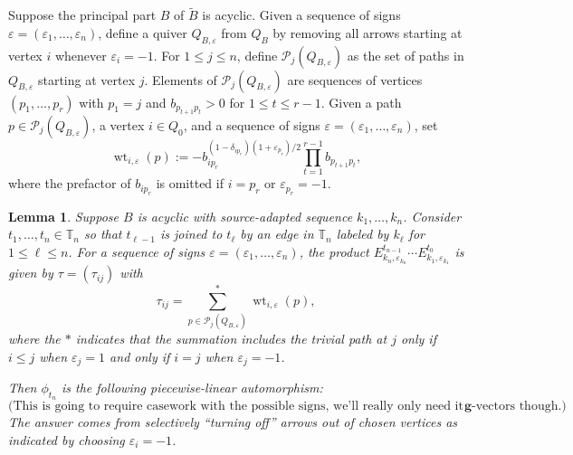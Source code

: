 \documentclass{amsart}
\newtheorem{lemma}[theorem]{Lemma}
\numberwithin{theorem}{section}
\newcommand{\bfg}{\boldsymbol{g}}
\newcommand{\cP}{\mathcal{P}}
\newcommand{\TT}{\mathbb{T}}
\newcommand{\wt}{{\operatorname{wt}}}
\begin{document}
  Suppose the principal part $B$ of $\tilde{B}$ is acyclic.
  Given a sequence of signs $\varepsilon=(\varepsilon_1,\ldots,\varepsilon_n)$, define a quiver $Q_{B,\varepsilon}$ from $Q_B$ by removing all arrows starting at vertex $i$ whenever $\varepsilon_i=-1$.
  For $1\le j\le n$, define $\cP_j(Q_{B,\varepsilon})$ as the set of paths in $Q_{B,\varepsilon}$ starting at vertex $j$.
  Elements of $\cP_j(Q_{B,\varepsilon})$ are sequences of vertices $(p_1,\ldots,p_r)$ with $p_1=j$ and $b_{p_{t+1}p_t}>0$ for $1\le t\le r-1$.
  Given a path $p\in\cP_j(Q_{B,\varepsilon})$, a vertex $i\in Q_0$, and a sequence of signs $\varepsilon=(\varepsilon_1,\ldots,\varepsilon_n)$, set
  \[\wt_{i,\varepsilon}(p):=-b_{ip_r}^{(1-\delta_{ip_r})(1+\varepsilon_{p_r})/2}\prod_{t=1}^{r-1} b_{p_{t+1}p_t},\]
  where the prefactor of $b_{ip_r}$ is omitted if $i=p_r$ or $\varepsilon_{p_r}=-1$.
  \begin{lemma}
    Suppose $B$ is acyclic with source-adapted sequence $k_1,\ldots,k_n$.
    Consider $t_1,\ldots,t_n\in\TT_n$ so that $t_{\ell-1}$ is joined to $t_\ell$ by an edge in $\TT_n$ labeled by $k_\ell$ for $1\le\ell\le n$.
    For a sequence of signs $\varepsilon=(\varepsilon_1,\ldots,\varepsilon_n)$, the product $E^{t_{n-1}}_{k_n,\varepsilon_{k_n}}\cdots E^{t_0}_{k_1,\varepsilon_{k_1}}$ is given by $\tau=(\tau_{ij})$ with
    \begin{equation}
      \label{eq:tropical twist}
      \tau_{ij}=\sum_{p\in\cP_j(Q_{B,\varepsilon})}^* \wt_{i,\varepsilon}(p),
    \end{equation}
    where the $*$ indicates that the summation includes the trivial path at $j$ only if $i\le j$ when $\varepsilon_j=1$ and only if $i=j$ when $\varepsilon_j=-1$.

    Then $\phi_{t_n}$ is the following piecewise-linear automorphism:
    \begin{equation}
      \label{eq:tropical twist}
      \text{(This is going to require casework with the possible signs, we'll really only need it for imaginary $\bfg$-vectors though.)}
    \end{equation}
    The answer comes from selectively ``turning off'' arrows out of chosen vertices as indicated by choosing $\varepsilon_i=-1$.
  \end{lemma}
\end{document}
